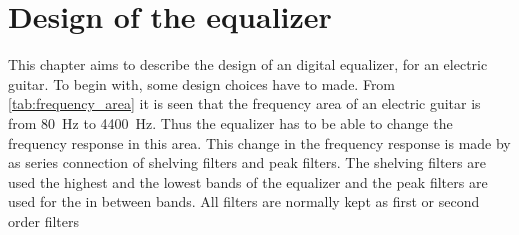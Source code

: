 \section{Design of the equalizer}
This chapter aims to describe the design of an digital equalizer, for an electric guitar. 
To begin with, some design choices have to made. From \autoref{tab:frequency_area} it is seen that the frequency area of an electric guitar is from \SI{80}{\hertz} to \SI{4400}{\hertz}. Thus the equalizer has to be able to change the frequency response in this area. This change in the frequency response is made by as series connection of shelving filters and peak filters. The shelving filters are used the highest and the lowest bands of the equalizer and the peak filters are used for the in between bands. All filters are normally kept as first or second order filters 



%
%
%
%
%
%
%
